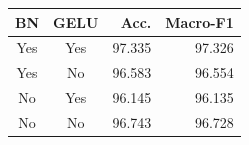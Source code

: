 \begin{tabular}{ccrr}
\toprule BN & GELU & Acc. & Macro-F1\\
\midrule
Yes & Yes & 97.335 & 97.326\\
Yes & No & 96.583 & 96.554\\
No & Yes & 96.145 & 96.135\\
No & No & 96.743 & 96.728\\
\bottomrule
\end{tabular}

